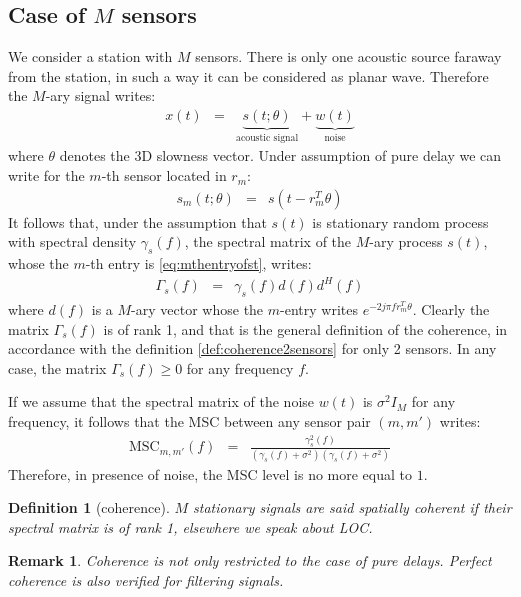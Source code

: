 \documentclass[a4paper, 12pt]{report}
\newtheorem{remark}{Remark}
\newtheorem{definition}{Definition}
\def\MSC{\mathrm{MSC}}
\begin{document}
\subsection{Case of $M$ sensors}
We consider a station with $M$ sensors. There is only one acoustic source faraway from the station, in such a way it can be considered as planar wave. Therefore the $M$-ary signal  writes: 
\begin{eqnarray*}
x(t) & = & \underbrace{s(t;\theta)}_{\text{acoustic signal}}+ \underbrace{w(t)}_{\text{noise}}
\end{eqnarray*}
where $\theta$ denotes the 3D slowness vector. Under assumption of pure delay we can write for the $m$-th sensor located in $r_{m}$:
\begin{eqnarray}
\label{eq:mthentryofst}
s_{m}(t;\theta)&=&s(t-r_{m}^{T}\theta)
\end{eqnarray}
It follows  that, under the assumption  that $s(t)$ is stationary random process with spectral density $\gamma_{s}(f)$, the spectral matrix of the $M$-ary process $s(t)$, whose the $m$-th entry is \eqref{eq:mthentryofst}, writes:
\begin{eqnarray*}
\Gamma_{s}(f)&=&\gamma_{s}(f)d(f)d^{H}(f)
\end{eqnarray*}
where $d(f)$ is a $M$-ary vector whose the $m$-entry writes $e^{-2j\pi fr_{m}^{T}\theta}$. Clearly the matrix $\Gamma_{s}(f)$ is of rank 1, and that is the general definition of the coherence, in accordance with the definition \ref{def:coherence2sensors} for only 2 sensors. In any case, the matrix $\Gamma_{s}(f)\geq 0$ for any frequency $f$.

If we assume that the spectral matrix of the noise $w(t)$ is $\sigma^{2}I_M$ for any frequency, it follows that the MSC between any  sensor pair $(m,m')$ writes:
\begin{eqnarray*}
 \MSC_{m,m'}(f)&=& \frac{\gamma_{s}^{2}(f)}{(\gamma_{s}(f)+\sigma^{2})(\gamma_{s}(f)+\sigma^{2})}
\end{eqnarray*}
Therefore, in presence of noise, the MSC level is no more equal to $1$.

\begin{definition}[coherence]
\label{def:coherenceMsensors}
$M$ stationary signals are said spatially coherent if their spectral matrix is of rank 1, elsewhere we speak about LOC. 
\end{definition}

\begin{remark}
Coherence is not only restricted to the case of pure delays. Perfect coherence is also verified for filtering signals.
\end{remark}
\end{document}
